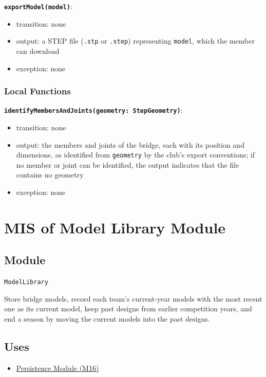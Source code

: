 \documentclass[12pt, titlepage]{article}
\begin{document}
\textbf{\texttt{exportModel(model)}}:
\begin{itemize}
  \item transition: none
  \item output: a STEP file (\texttt{.stp} or \texttt{.step}) representing \texttt{model}, which the member can download
  \item exception: none
\end{itemize}

\subsubsection{Local Functions}

\textbf{\texttt{identifyMembersAndJoints(geometry: StepGeometry)}}:
\begin{itemize}
  \item transition: none
  \item output: the members and joints of the bridge, each with its position and dimensions, as identified from \texttt{geometry} by the club's export conventions; if no member or joint can be identified, the output indicates that the file contains no geometry
  \item exception: none
\end{itemize}

\newpage

\section{MIS of Model Library Module} \label{mModelLibrary}

\subsection{Module}
\texttt{ModelLibrary}

Store bridge models, record each team's current-year models with the most recent one as its current model, keep past designs from earlier competition years, and end a season by moving the current models into the past designs.

\subsection{Uses}
\begin{itemize}
  \item \hyperref[mPersist]{Persistence Module (M16)}
\end{itemize}
\end{document}
